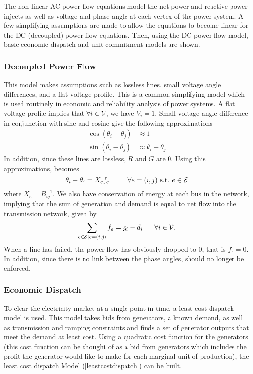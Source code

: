 The non-linear AC power flow equations model the net power and reactive power injects as well as voltage and phase angle at each vertex of the power system.  A few simplifying assumptions are made to allow the equations to become linear for the DC (decoupled) power flow equations.  Then, using the DC power flow model, basic economic dispatch and unit commitment models are shown.  

\subsubsection{Decoupled Power Flow}
This model makes assumptions such as lossless lines, small voltage angle differences, and a flat voltage profile.  This is a common simplifying model which is used routinely in economic and reliability analysis of power systems.  A flat voltage profile implies that $\forall i \in \mathcal{V}$, we have $V_i = 1$.  Small voltage angle difference in conjunction with sine and cosine give the following approximations
\begin{align}
\cos(\theta_i - \theta_j) &\approx 1	\\
\sin(\theta_i-\theta_j) & \approx \theta_i - \theta_j
\end{align}
In addition, since these lines are lossless, $R$ and $G$ are 0.  Using this approximations,  becomes
\begin{equation}	\displaystyle
\theta_{i} - \theta_{j} = X_{e} f_{e}			\hspace{27px}	\forall e=(i,j) \mbox{ s.t. } e \in \cE   \label{pf2}
\end{equation}
where $X_e = B_{ij}^{-1}$.  We also have conservation of energy at each bus in the network, implying that the sum of generation and demand is equal to net flow into the transmission network, given by
\begin{equation}
\sum_{e \in \cE | e=(i,j)}{f_{e}} = g_{i} -d_{i} \hspace{17px}   \forall i \in \cV.   \label{pf1}
\end{equation}
When a line has failed, the power flow has obviously dropped to 0, that is $f_e = 0$.  In addition,  since there is no link between the phase angles,  should no longer be enforced.

\subsubsection{Economic Dispatch}
To clear the electricity market at a single point in time, a least cost dispatch model is used.  This model takes bids from generators, a known demand, as well as transmission and ramping constraints and finds a set of generator outputs that meet the demand at least cost.  Using a quadratic cost function for the generators (this cost function can be thought of as a bid from generators which includes the profit the generator would like to make for each marginal unit of production), the least cost dispatch Model (\ref{leastcostdispatch}) can be built. 

